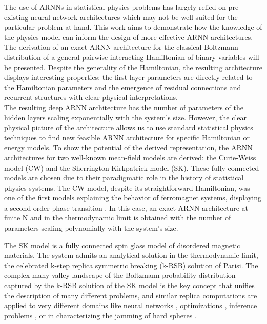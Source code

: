 \documentclass[aps,physrev,10pt,floatfix,reprint]{revtex4-2}
\begin{document}
The use of ARNNs in statistical physics problems has largely relied on pre-existing neural network architectures which may not be well-suited for the particular problem at hand. This work aims to demonstrate how the knowledge of the physics model can inform the design of more effective ARNN architectures. The derivation of an exact ARNN architecture for the classical Boltzmann distribution of a general pairwise interacting Hamiltonian of binary variables will be presented. Despite the generality of the Hamiltonian, the resulting architecture displays interesting properties: the first layer parameters are directly related to the Hamiltonian parameters and the emergence of residual connections and recurrent structures with clear physical interpretations.\\
The resulting deep ARNN architecture has the number of parameters of the hidden layers scaling exponentially with the system's size. 
However, the clear physical picture of the architecture allows us to use standard statistical physics techniques to find new feasible ARNN architecture for specific Hamiltonian or energy models. To show the potential of the derived representation, the ARNN architectures for two well-known mean-field models are derived: the Curie-Weiss model (CW) and the Sherrington-Kirkpatrick model (SK). These fully connected models are chosen due to their paradigmatic role in the history of statistical physics systems. The CW model, despite its straightforward Hamiltonian, was one of the first models explaining the behavior of ferromagnet systems, displaying a second-order phase transition \cite{kadanoff2000statistical}. In this case, an exact ARNN architecture at finite N and in the thermodynamic limit is obtained with the number of parameters scaling polynomially with the system's size.

The SK model \cite{PhysRevLett.35.1792} is a fully connected spin glass model of disordered magnetic materials. The system admits an analytical solution in the thermodynamic limit, the celebrated \cite{Nobel2021} k-step replica symmetric breaking (k-RSB) solution \cite{PARISI1979203, PhysRevLett.43.1754} of Parisi. The complex many-valley landscape of the Boltzmann probability distribution captured by the k-RSB solution of the SK model is the key concept that unifies the description of many different problems, and similar replica computations are applied to very different domains like neural networks \cite{Gardner_1987, PhysRevLett.55.1530}, optimizations \cite{doi:10.1126/science.1073287}, inference problems \cite{doi:10.1080/00018732.2016.1211393}, or in characterizing the jamming of hard spheres \cite{RevModPhys.82.789, PhysRevLett.102.195701}. 
\end{document}
